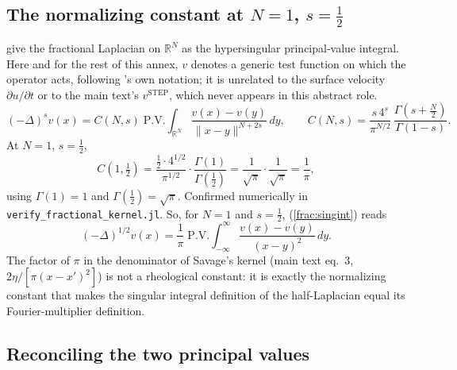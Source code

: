 \documentclass{article}
\begin{document}
\subsection{The normalizing constant at $N=1$, $s=\tfrac12$}

\citet{daoud2022fractional} give the fractional Laplacian on $\mathbb{R}^N$
as the hypersingular principal-value integral. Here and for the rest of
this annex, $v$ denotes a generic test function on which the operator
acts, following \citeauthor{daoud2022fractional}'s own notation; it is
unrelated to the surface velocity $\partial u/\partial t$ or to the main
text's $v^{\mathrm{STEP}}$, which never appears in this abstract role.
\begin{equation}
(-\Delta)^s v(x) = C(N,s)\;\mathrm{P.V.}\!\int_{\mathbb{R}^N}
  \frac{v(x)-v(y)}{\|x-y\|^{N+2s}}\,dy,
\qquad
C(N,s) = \frac{s\,4^s}{\pi^{N/2}}\,\frac{\Gamma(s+\tfrac{N}{2})}{\Gamma(1-s)}.
\label{frac:singint}
\end{equation}
At $N=1$, $s=\tfrac12$,
\begin{equation}
C\!\left(1,\tfrac12\right)
= \frac{\tfrac12\cdot 4^{1/2}}{\pi^{1/2}}\cdot\frac{\Gamma(1)}{\Gamma(\tfrac12)}
= \frac{1}{\sqrt\pi}\cdot\frac{1}{\sqrt\pi}
= \boxed{\frac{1}{\pi}},
\label{frac:C1half}
\end{equation}
using $\Gamma(1)=1$ and $\Gamma(\tfrac12)=\sqrt\pi$. Confirmed numerically in
\texttt{verify\_fractional\_kernel.jl}. So, for $N=1$ and $s=\tfrac12$,
(\ref{frac:singint}) reads
\begin{equation}
(-\Delta)^{1/2}v(x) = \frac{1}{\pi}\;\mathrm{P.V.}\!\int_{-\infty}^{\infty}
  \frac{v(x)-v(y)}{(x-y)^2}\,dy.
\label{frac:half}
\end{equation}
The factor of $\pi$ in the denominator of Savage's kernel
(main text eq.~3, $2\eta/[\pi(x-x')^2]$) is not a rheological constant: it
is exactly the normalizing constant that makes the singular integral
definition of the half-Laplacian equal its Fourier-multiplier definition.

\subsection{Reconciling the two principal values}
\label{sec:hadamard}
\end{document}
